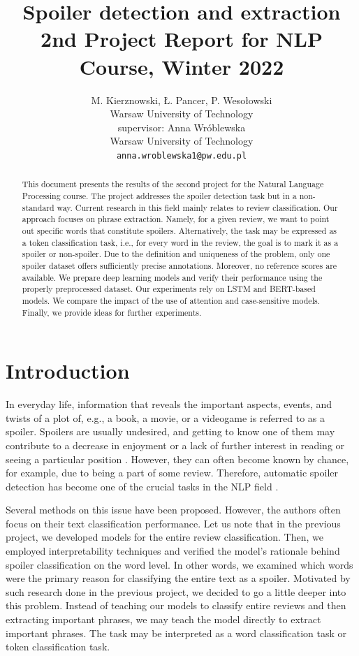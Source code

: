 \documentclass[11pt]{article}
\title{Spoiler detection and extraction\\2nd Project Report for NLP Course, Winter 2022}
\author{M. Kierznowski, Ł. Pancer, P. Wesołowski \\
  Warsaw University of Technology \\
  \And
    supervisor: Anna Wróblewska \\
  Warsaw University of Technology \\
    {\tt anna.wroblewska1@pw.edu.pl}
    }
\date{}
\begin{document}
\maketitle
\begin{abstract}
This document presents the results of the second project for the Natural Language Processing course. The project addresses the spoiler detection task but in a non-standard way. Current research in this field mainly relates to review classification. Our approach focuses on phrase extraction. Namely, for a given review, we want to point out specific words that constitute spoilers. Alternatively, the task may be expressed as a token classification task, i.e., for every word in the review, the goal is to mark it as a spoiler or non-spoiler. Due to the definition and uniqueness of the problem, only one spoiler dataset offers sufficiently precise annotations. Moreover, no reference scores are available. We prepare deep learning models and verify their performance using the properly preprocessed dataset. Our experiments rely on LSTM and BERT-based models. We compare the impact of the use of attention and case-sensitive models. Finally, we provide ideas for further experiments.
\end{abstract}

\section{Introduction}

In everyday life, information that reveals the important aspects, events, and twists of a plot of, e.g., a book, a movie, or a videogame is referred to as a spoiler. Spoilers are usually undesired, and getting to know one of them may contribute to a decrease in enjoyment \cite{abbott2020can} or a lack of further interest in reading or seeing a particular position \cite{li2022exploring}. However, they can often become known by chance, for example, due to being a part of some review. Therefore, automatic spoiler detection has become one of the crucial tasks in the NLP field \cite{guo2010finding}.

Several methods on this issue have been proposed. However, the authors often focus on their text classification performance. Let us note that in the previous project, we developed models for the entire review classification. Then, we employed interpretability techniques and verified the model's rationale behind spoiler classification on the word level. In other words, we examined which words were the primary reason for classifying the entire text as a spoiler. Motivated by such research done in the previous project, we decided to go a little deeper into this problem. Instead of teaching our models to classify entire reviews and then extracting important phrases, we may teach the model directly to extract important phrases. The task may be interpreted as a word classification task or token classification task.
\end{document}
